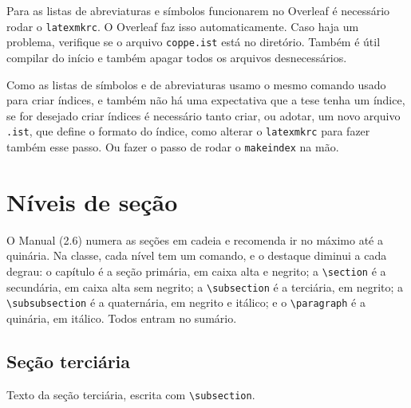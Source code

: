\documentclass[dsc,pdfa]{coppe}
\begin{document}
  Para as listas de abreviaturas e símbolos funcionarem no Overleaf é necessário rodar o \verb|latexmkrc|. O Overleaf faz isso automaticamente. Caso haja um problema, verifique se o arquivo \verb|coppe.ist| está no diretório. Também é útil compilar do início e também apagar todos os arquivos desnecessários.

  Como as listas de símbolos e de abreviaturas usamo o mesmo comando usado para criar índices, e também não há uma expectativa que a tese tenha um índice, se for desejado criar índices é necessário tanto criar, ou adotar, um novo arquivo \verb*|.ist|, que define o formato do índice, como alterar o \verb*|latexmkrc| para fazer também esse passo. Ou fazer o passo de rodar o \verb*|makeindex| na mão.

\section{Níveis de seção}
\label{sec:niveis}

O Manual (2.6) numera as seções em cadeia e recomenda ir no máximo até a quinária. Na classe, cada nível tem um comando, e o destaque diminui a cada degrau: o capítulo é a seção primária, em caixa alta e negrito; a \verb|\section| é a secundária, em caixa alta sem negrito; a \verb|\subsection| é a terciária, em negrito; a \verb|\subsubsection| é a quaternária, em negrito e itálico; e o \verb|\paragraph| é a quinária, em itálico. Todos entram no sumário.

\subsection{Seção terciária}

Texto da seção terciária, escrita com \verb|\subsection|.
\end{document}
